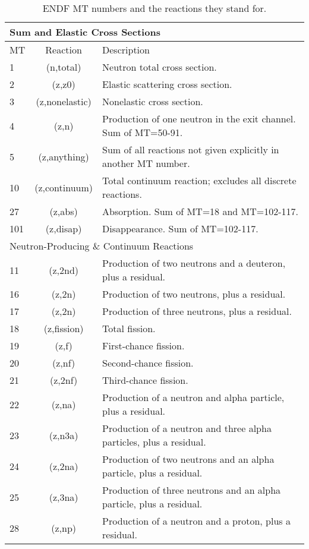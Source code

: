 \begin{table}[h]
\centering
\caption{ENDF MT numbers and the reactions they stand for. \cite{endfnums}}
\label{MT_numbers}\scriptsize
\begin{tabular}{| l | c | l |}
\multicolumn{3}{l}{Sum and Elastic Cross Sections}\\
\hline
MT & Reaction & Description \\
\hline
1	  & (n,total)	    &  Neutron total cross section. \\
2	  & (z,z0)	      & Elastic scattering cross section.\\
3	  & (z,nonelastic)&	Nonelastic cross section. \\
4	  & (z,n)	        &  Production of one neutron in the exit channel. Sum of MT=50-91.	\\
5	  & (z,anything)	& Sum of all reactions not given explicitly in another MT number. \\
10	& (z,continuum)	& Total continuum reaction; excludes all discrete reactions.	\\
27	& (z,abs)	    &    Absorption. Sum of MT=18 and MT=102-117.	\\
101	& (z,disap)	  &   Disappearance. Sum of MT=102-117.	\\
\hline
\multicolumn{3}{l}{Neutron-Producing \& Continuum Reactions}\\
\hline
11	& (z,2nd)	    &  Production of two neutrons and a deuteron, plus a residual.	\\
16	& (z,2n)	    &   Production of two neutrons, plus a residual.	\\
17	& (z,2n)	    &   Production of three neutrons, plus a residual.	\\
18	& (z,fission)  &	   Total fission.\\
19	& (z,f)	   &      First-chance fission.	\\
20	& (z,nf)	 &       Second-chance fission.	\\
21	& (z,2nf)	 &    Third-chance fission.	\\
22	& (z,na)	 &    Production of a neutron and alpha particle, plus a residual.	\\
23	& (z,n3a)	 &    Production of a neutron and three alpha particles, plus a residual.	\\
24	& (z,2na)	 &    Production of two neutrons and an alpha particle, plus a residual.	\\
25	& (z,3na)	 &    Production of three neutrons and an alpha particle, plus a residual.	\\
28	& (z,np)	 &    Production of a neutron and a proton, plus a residual.	\\

\end{tabular}
\end{table}
